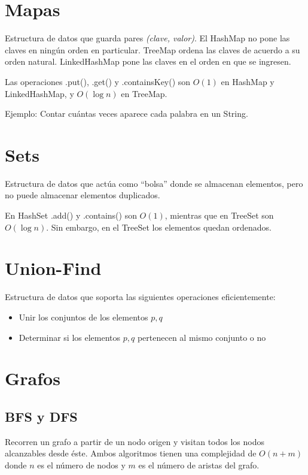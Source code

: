 \documentclass{article}
\begin{document}
\begin{multicols}{2}

\tableofcontents

\section{Mapas}
Estructura de datos que guarda pares \emph{(clave, valor)}. El HashMap no pone las claves en ningún orden en particular. TreeMap ordena las claves de acuerdo a su orden natural. LinkedHashMap pone las claves en el orden en que se ingresen.

Las operaciones .put(), .get() y .containsKey() son \( O(1) \) en HashMap y LinkedHashMap, y \( O(\log n) \) en TreeMap.

Ejemplo: Contar cuántas veces aparece cada palabra en un String.


\section{Sets}
Estructura de datos que actúa como ``bolsa'' donde se almacenan elementos, pero no puede almacenar elementos duplicados.

En HashSet .add() y .contains() son \( O(1) \), mientras que en TreeSet son \( O(\log n) \). Sin embargo, en el TreeSet los elementos quedan ordenados.


\section{Union-Find}
Estructura de datos que soporta las siguientes operaciones eficientemente:
\begin{itemize}
	\item Unir los conjuntos de los elementos \( p, q \)
	\item Determinar si los elementos \( p, q \) pertenecen al mismo conjunto o no
\end{itemize}


\section{Grafos}
	\subsection{BFS y DFS}
	Recorren un grafo a partir de un nodo origen y visitan todos los nodos alcanzables desde éste. Ambos algoritmos tienen una complejidad de \( O(n + m) \) donde \( n \) es el número de nodos y \( m \) es el número de aristas del grafo. 
	

\end{multicols}
\end{document}
